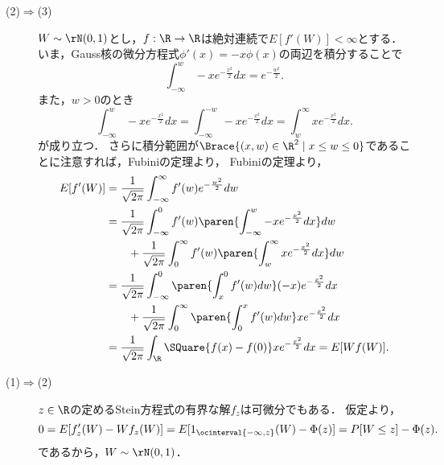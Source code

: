 \documentclass[uplatex,dvipdfmx]{jsreport}
\begin{document}
\begin{Proof}\mbox{}
    \begin{description}
        \item[(2)$\Rightarrow$(3)] $W\sim\rN(0,1)$とし，$f:\R\to\R$は絶対連続で$E[f'(W)]<\infty$とする．
        いま，Gauss核の微分方程式$\phi'(x)=-x\phi(x)$の両辺を積分することで
        \[\int^w_{-\infty}-xe^{-\frac{x^2}{2}}dx=e^{-\frac{w^2}{2}}.\]
        また，$w>0$のとき
        \[\int^w_{-\infty}-xe^{-\frac{x^2}{2}}dx=\int^{-w}_{-\infty}-xe^{-\frac{x^2}{2}}dx=\int^\infty_wxe^{-\frac{x^2}{2}}dx.\]
        が成り立つ．
        さらに積分範囲が$\Brace{(x,w)\in\R^2\mid x\le w\le0}$であることに注意すれば，Fubiniの定理より，
        Fubiniの定理より，
        \begin{align*}
            E[f'(W)]&=\frac{1}{\sqrt{2\pi}}\int^\infty_{-\infty}f'(w)e^{-\frac{w^2}{2}}dw\\
            &=\frac{1}{\sqrt{2\pi}}\int^0_{-\infty}f'(w)\paren{\int^w_{-\infty}-xe^{-\frac{x^2}{2}}dx}dw\\
            &\qquad +\frac{1}{\sqrt{2\pi}}\int^\infty_0f'(w)\paren{\int^\infty_wxe^{-\frac{x^2}{2}}dx}dw\\
            &=\frac{1}{\sqrt{2\pi}}\int^0_{-\infty}\paren{\int^0_xf'(w)dw}(-x)e^{-\frac{x^2}{2}}dx\\
            &\qquad +\frac{1}{\sqrt{2\pi}}\int^\infty_0\paren{\int^x_0f'(w)dw}xe^{-\frac{x^2}{2}}dx\\
            &=\frac{1}{\sqrt{2\pi}}\int_\R\SQuare{f(x)-f(0)}xe^{-\frac{x^2}{2}}dx=E[Wf(W)].
        \end{align*}
        \item[(1)$\Rightarrow$(2)] $z\in\R$の定めるStein方程式の有界な解$f_z$は可微分でもある．
        仮定より，
        \[0=E[f'_z(W)-Wf_z(W)]=E[1_{\ocinterval{-\infty,z}}(W)-\Phi(z)]=P[W\le z]-\Phi(z).\]
        であるから，$W\sim\rN(0,1)$．
    \end{description}
\end{Proof}
\end{document}
